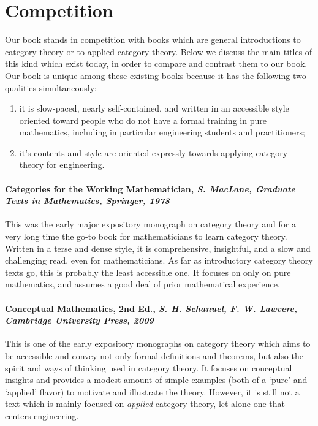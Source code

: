 \documentclass[10pt, article, one side]{memoir}
\begin{document}
    \section{Competition}
    
    Our book stands in competition with books which are general introductions to category theory or to applied category theory. Below we discuss the main titles of this kind which exist today, in order to compare and contrast them to our book.  Our book is unique among these existing books because it has the following two qualities simultaneously: 
\begin{enumerate}
\item it is slow-paced, nearly self-contained, and written in an accessible style oriented toward people who do not have a formal training in pure mathematics, including in particular engineering students and practitioners;
\item it's contents and style are oriented expressly towards applying category theory for engineering.  
\end{enumerate} 
    
\paragraph{Categories for the Working Mathematician, \emph{S. MacLane, Graduate Texts in Mathematics, Springer, 1978}}

This was the early major expository monograph on category theory and for a very long time the go-to book for mathematicians to learn category theory. Written in a terse and dense style, it is comprehensive, insightful, and a slow and challenging read, even for mathematicians. As far as introductory category theory texts go, this is probably the least accessible one. It focuses on only on pure mathematics, and assumes a good deal of prior mathematical experience. 

\paragraph{Conceptual Mathematics, 2nd Ed., \emph{S. H. Schanuel, F. W. Lawvere, Cambridge University Press, 2009}}

This is one of the early expository monographs on category theory which aims to be accessible and convey not only formal definitions and theorems, but also the spirit and ways of thinking used in category theory. It focuses on conceptual insights and provides a modest amount of simple examples (both of a `pure' and `applied' flavor) to motivate and illustrate the theory. However, it is still not a text which is mainly focused on \emph{applied} category theory, let alone one that centers engineering.  
\end{document}
